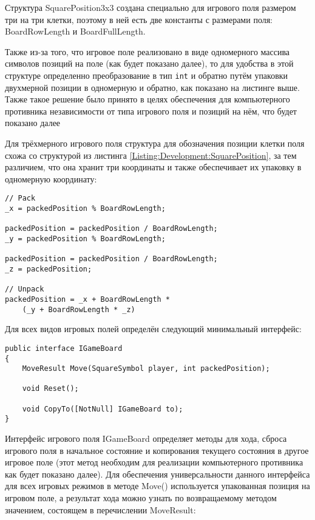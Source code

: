 Структура SquarePosition3x3 создана специально для игрового поля размером три на три клетки, поэтому в ней есть две константы с размерами поля: BoardRowLength и BoardFullLength.

Также из-за того, что игровое поле реализовано в виде одномерного массива символов позиций на поле (как будет показано далее), то для удобства в этой структуре определенно преобразование в тип \lstinline{int} и обратно путём упаковки двухмерной позиции в одномерную и обратно, как показано на листинге выше. Также такое решение было принято в целях обеспечения для компьютерного противника независимости от типа игрового поля и позиций на нём, что будет показано далее

Для трёхмерного игрового поля структура для обозначения позиции клетки поля схожа со структурой из листинга \ref{Listing:Development:SquarePosition}, за тем различием, что она хранит три координаты и также обеспечивает их упаковку в одномерную координату:

\begin{lstlisting}[caption={Пример упаковки и распаковки трёхмерной позиции}]
// Pack
_x = packedPosition % BoardRowLength;

packedPosition = packedPosition / BoardRowLength;
_y = packedPosition % BoardRowLength;

packedPosition = packedPosition / BoardRowLength;
_z = packedPosition;

// Unpack
packedPosition = _x + BoardRowLength *
    (_y + BoardRowLength * _z)
\end{lstlisting}

Для всех видов игровых полей определён следующий минимальный интерфейс:

\begin{lstlisting}[caption={Интерфейс игрового поля}]
public interface IGameBoard
{
    MoveResult Move(SquareSymbol player, int packedPosition);

    void Reset();

    void CopyTo([NotNull] IGameBoard to);
}
\end{lstlisting}

Интерфейс игрового поля IGameBoard определяет методы для хода, сброса игрового поля в начальное состояние и копирования текущего состояния в другое игровое поле (этот метод необходим для реализации компьютерного противника как будет показано далее). Для обеспечения универсальности данного интерфейса для всех игровых режимов в методе Move() используется упакованная позиция на игровом поле, а результат хода можно узнать по возвращаемому методом значением, состоящем в перечислении MoveResult:

